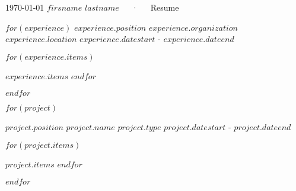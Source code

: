 \documentclass[11pt, a4paper]{awesome-cv}
\begin{document}
\makecvheader[C]

\makecvfooter
  {\today}
  {$firsname$ $lastname$~~~·~~~Resume}
  {\thepage}


\begin{cventries}
\end{cventries}

\begin{cventries}
$for(experience)$
  \cventry
    {$experience.position$} %
    {$experience.organization$} %
    {$experience.location$} %
    {$experience.datestart$ - $experience.dateend$} %
    {
      \begin{cvitems} %
        $for(experience.items)$
        \item{$experience.items$}
        $endfor$
      \end{cvitems}
    }
    \linebreak
$endfor$
\end{cventries}



\begin{cventries}
$for(project)$
  
  \cventry
    {$project.position$} %
    {$project.name$} %
    {$project.type$} %
    {$project.datestart$ - $project.dateend$} %
    {
      \begin{cvitems} %
        $for(project.items)$
        \item{$project.items$}
        $endfor$
      \end{cvitems}
    }
    \linebreak
$endfor$

\end{cventries}
\end{document}
